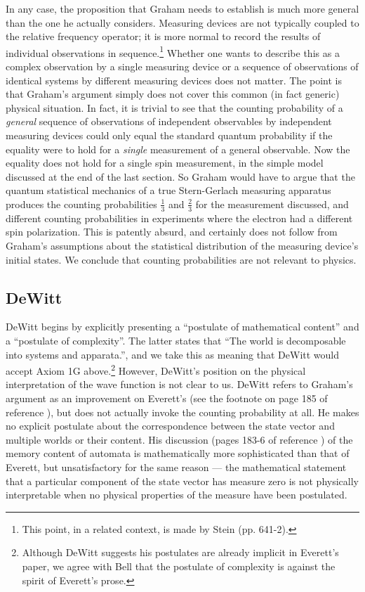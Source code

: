 \documentclass[aps,pra,12pt]{revtex4}
\begin{document}
In any case, the proposition that Graham needs to establish is much
more general than the one he actually considers.  
Measuring devices are not typically coupled to the
relative frequency operator; it is more normal to record the results of
individual observations in sequence.\footnote{This point, in a related context,
is made by Stein\cite{stein} (pp. 641-2).}
Whether one wants to describe this as
a complex observation by a single measuring device or 
a sequence of observations of identical systems by different measuring devices
does not matter. 
The point is that 
Graham's
argument simply does not cover this common (in fact generic) physical 
situation.
In fact, it is trivial to see that the counting probability of a {\em general}
sequence of observations of independent observables by independent 
measuring devices could only equal the standard quantum probability
if the equality were to hold for a {\em single} measurement of a general 
observable.  
Now the equality does not hold for a single spin measurement, in the
simple model discussed at the end of the last section.
So Graham would have to argue that the quantum statistical mechanics of a true
Stern-Gerlach measuring apparatus produces the counting 
probabilities $\frac{1}{3}$ and $\frac{2}{3}$ for the measurement discussed,
and different counting probabilities in experiments where the electron had
a different spin polarization.
This is patently absurd, and certainly does not follow 
from Graham's assumptions about the statistical 
distribution of the measuring device's initial states. 
We conclude that counting probabilities are not relevant to physics. 

\subsection{DeWitt}

DeWitt begins by explicitly presenting a ``postulate of mathematical
content'' and a ``postulate of complexity''.
The latter states 
that ``The world is decomposable into systems and apparata.'', 
and we take this as meaning that DeWitt would accept 
Axiom 1G above.\footnote{Although DeWitt suggests his postulates are already 
implicit in Everett's paper,\cite{ev} 
we agree with Bell\cite{bell2} that
the postulate of complexity is against the spirit of Everett's 
prose.}
However, DeWitt's position on the physical interpretation of the wave
function is not clear to us. 
DeWitt refers to Graham's argument as an improvement on Everett's (see the
footnote on page 185 of reference \cite{mwbook}), but does not actually 
invoke the counting probability at all.
He makes no explicit postulate about the correspondence between the state
vector and multiple worlds or their content.
His discussion (pages 183-6 of reference \cite{mwbook}) of the memory
content of automata is mathematically more sophisticated than that of
Everett, but unsatisfactory for the same reason --- the mathematical
statement that a particular component of the state vector has measure
zero is not physically interpretable when no physical properties of
the measure have been postulated.
\end{document}
